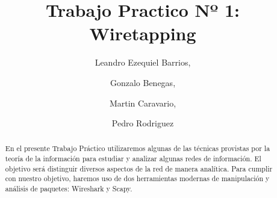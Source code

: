 \documentclass[final,narroweqnarray,inline]{ieee}
\begin{document}
\title[Trabajo Practico Nº 1: Wiretapping]{%
       Trabajo Practico Nº 1: Wiretapping}

\author[SHORT NAMES]{%
	Leandro Ezequiel Barrios,
	\and
	Gonzalo Benegas,
	\and
	Martin Caravario, 
	\and
	Pedro Rodriguez 
}





\maketitle               


\begin{abstract}
En el presente Trabajo Práctico utilizaremos algunas de las técnicas
provistas por la teoría de la información para estudiar y analizar algunas
redes de información. El objetivo será distinguir diversos aspectos de la
red de manera analítica. Para cumplir con nuestro objetivo, haremos uso de
dos herramientas modernas de manipulación y análisis de paquetes: Wireshark
y Scapy.
\end{abstract}


\end{document}
